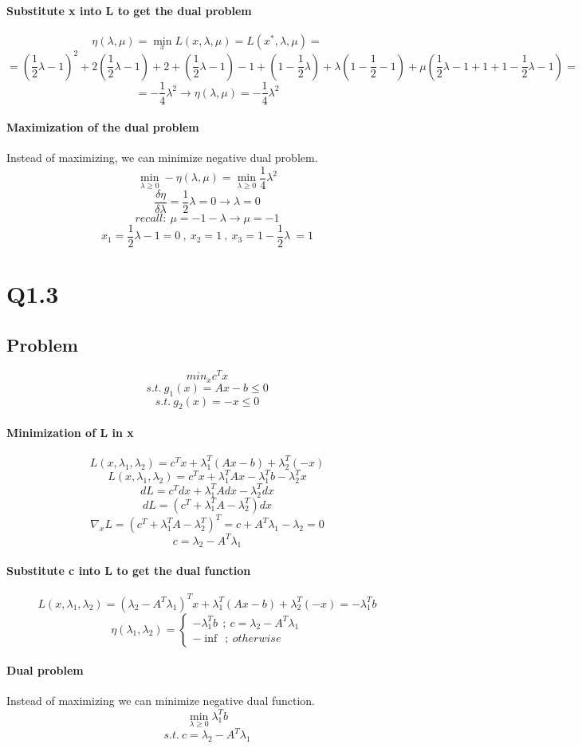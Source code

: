\documentclass[12pt]{article}
\begin{document}
\paragraph{Substitute x into L to get the dual problem}
\[\eta(\lambda , \mu) = \min_x L(x, \lambda, \mu) = L(x^*, \lambda, \mu) = \]
\[= (\frac{1}{2} \lambda - 1)^2 +2(\frac{1}{2} \lambda - 1)+2+(\frac{1}{2} \lambda - 1)-1+(1 - \frac{1}{2} \lambda)+ \lambda(1 - \frac{1}{2} - 1) + \mu(\frac{1}{2} \lambda - 1 + 1 + 1 - \frac{1}{2} \lambda - 1) = \]
\[= - \frac{1}{4} \lambda ^2 \longrightarrow \eta(\lambda , \mu) = - \frac{1}{4} \lambda ^2\]
\paragraph{Maximization of the dual problem}
Instead of maximizing, we can minimize negative dual problem.
\[ \min_{\lambda \geq 0} -\eta(\lambda , \mu) = \min_{\lambda \geq 0} \frac{1}{4} \lambda ^2\]
\[\frac{\delta \eta}{\delta \lambda} = \frac{1}{2} \lambda = 0 \longrightarrow \lambda=0 \]
\[recall: \ \mu = -1 - \lambda \longrightarrow \mu = -1\]
\[x_1 = \frac{1}{2} \lambda -1 = 0 \ , \ x_2 =1 \ , \ x_3 = 1 - \frac{1}{2} \lambda\ = 1\]

\newpage
\section{Q1.3}
\subsection{Problem}
\[min_x c^T x\]
\[s.t. \ g_1 (x) = Ax-b \leq 0 \]
\[s.t. \ g_2 (x) = -x \leq 0 \]

\paragraph{Minimization of L in x}
\[L(x,\lambda_1, \lambda_2) = c^T x + \lambda_1 ^T (Ax-b) + \lambda_2 ^T (-x)\]
\[L(x,\lambda_1, \lambda_2) = c^T x + \lambda_1 ^T Ax - \lambda_1 ^T b - \lambda_2 ^T x\]
\[dL = c^T dx + \lambda_1 ^T A dx - \lambda_2 ^ T dx \]
\[dL = (c^T + \lambda_1 ^T A - \lambda_2 ^T)dx \]
\[\nabla_x L = (c^T + \lambda_1 ^T A - \lambda_2 ^T)^T = c+A^T \lambda_1 - \lambda_2 =0\]
\[c=\lambda_2 - A^T \lambda_1\]
\paragraph{Substitute c into L to get the dual function}
\[L(x,\lambda_1, \lambda_2) = (\lambda_2 - A^T \lambda_1)^T x + \lambda_1 ^T (Ax-b) + \lambda_2 ^T (-x) = -\lambda_1 ^T b\]
  \[
    \eta(\lambda_1 , \lambda_2) =\left\{
                \begin{array}{ll}
                  -\lambda_1 ^T b \ \ ; \ c=\lambda_2 - A^T \lambda_1 \\
                  - \inf \ \ ; \ otherwise
                \end{array}
              \right.
  \]
\paragraph{Dual problem}
Instead of maximizing we can minimize negative dual function. 
\[\min_{\lambda \geq 0} \lambda_1 ^T b\]
\[s.t. \ c=\lambda_2 - A^T \lambda_1\]
\end{document}
